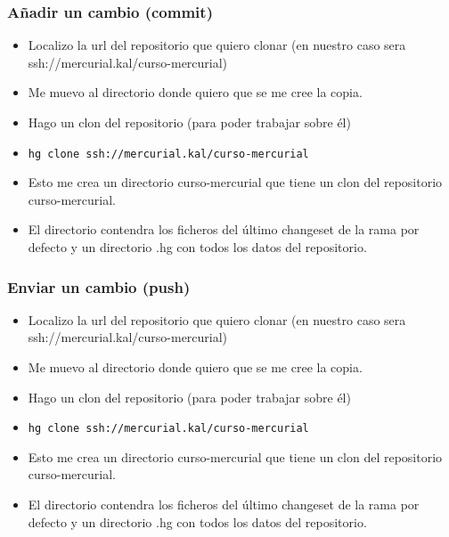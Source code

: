 \documentclass[10pt]{beamer}
\begin{document}
  \begin{frame}[containsverbatim]
    \frametitle{Añadir un cambio (commit)}
    \begin{itemize}
      \item Localizo la url del repositorio que quiero clonar (en nuestro caso sera ssh://mercurial.kal/curso-mercurial)
      \item Me muevo al directorio donde quiero que se me cree la copia.
      \item Hago un clon del repositorio (para poder trabajar sobre él)
      \item \verb+hg clone ssh://mercurial.kal/curso-mercurial+
      \item Esto me crea un directorio curso-mercurial que tiene un clon del repositorio curso-mercurial.
      \item El directorio contendra los ficheros del último changeset de la rama por defecto y un directorio .hg con todos los datos del repositorio.
    \end{itemize}
  \end{frame}

  \begin{frame}[containsverbatim]
    \frametitle{Enviar un cambio (push)}
    \begin{itemize}
      \item Localizo la url del repositorio que quiero clonar (en nuestro caso sera ssh://mercurial.kal/curso-mercurial)
      \item Me muevo al directorio donde quiero que se me cree la copia.
      \item Hago un clon del repositorio (para poder trabajar sobre él)
      \item \verb+hg clone ssh://mercurial.kal/curso-mercurial+
      \item Esto me crea un directorio curso-mercurial que tiene un clon del repositorio curso-mercurial.
      \item El directorio contendra los ficheros del último changeset de la rama por defecto y un directorio .hg con todos los datos del repositorio.
    \end{itemize}
  \end{frame}
\end{document}

